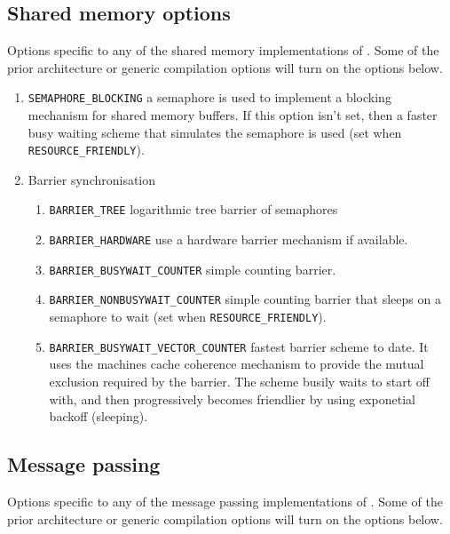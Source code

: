 \subsection{Shared memory options}
Options specific to any of the shared memory implementations of
\bsplib{}. Some of the prior architecture or generic compilation
options will turn on the options below.

\begin{enumerate}
\item \texttt{SEMAPHORE\_BLOCKING} a semaphore is used to implement a
  blocking mechanism for shared memory buffers. If this option isn't
  set, then a faster busy waiting scheme that simulates the semaphore
  is used (set when \texttt{RESOURCE\_FRIENDLY}).


\item Barrier synchronisation
  \begin{enumerate}
  \item \texttt{BARRIER\_TREE} logarithmic tree barrier of semaphores

  \item \texttt{BARRIER\_HARDWARE} use a hardware barrier mechanism if
    available.

  \item \texttt{BARRIER\_BUSYWAIT\_COUNTER} simple counting
    barrier.

  \item \texttt{BARRIER\_NONBUSYWAIT\_COUNTER} simple counting
    barrier that sleeps on a semaphore to wait (set when
    \texttt{RESOURCE\_FRIENDLY}).

  \item \texttt{BARRIER\_BUSYWAIT\_VECTOR\_COUNTER} fastest barrier
    scheme to date. It uses the machines cache coherence mechanism to
    provide the mutual exclusion required by the barrier. The scheme
    busily waits to start off with, and then progressively becomes
    friendlier by using exponetial backoff (sleeping).  
  \end{enumerate}
\end{enumerate}

\subsection{Message passing}
Options specific to any of the message passing implementations of
\bsplib{}. Some of the prior architecture or generic compilation
options will turn on the options below.



